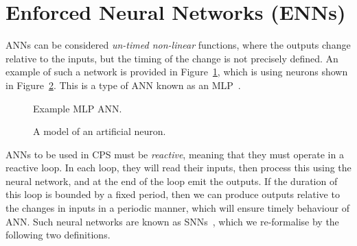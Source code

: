 \section{Enforced Neural Networks (\acp{ENN})}


\acp{ANN} can be considered \emph{un-timed non-linear} functions, 
where the outputs change relative to the inputs, but the timing of the change is not precisely defined. 
An example of such a network is provided in Figure~\ref{fig:mlp-ann},
which is using neurons shown in Figure~\ref{fig:artificial-neuron}. 
This is a type of \ac{ANN} known as an \acf{MLP}~\cite{yegnanarayana1994artificial}.

\begin{figure}
	\centering
	\scalebox{0.6}{}
	\caption{Example \ac{MLP} \ac{ANN}.	\label{fig:mlp-ann}}
\end{figure}
\begin{figure}
	\centering
	\scalebox{0.6}{}
	\caption{A model of an artificial neuron. \label{fig:artificial-neuron}}
\end{figure}


\acp{ANN} to be used
in CPS must be \emph{reactive}, meaning that they must operate in a
reactive loop.
In each loop, they will read their inputs,
then process this using the neural network, and at the end of the
loop emit the outputs. If the duration of this loop is bounded by a
fixed period, then we can produce outputs relative to the changes in
inputs in a periodic manner, which will ensure timely behaviour of
\ac{ANN}. Such neural networks are known as \acp{SNN}~\cite{sann}, which we
re-formalise by the following two definitions.

